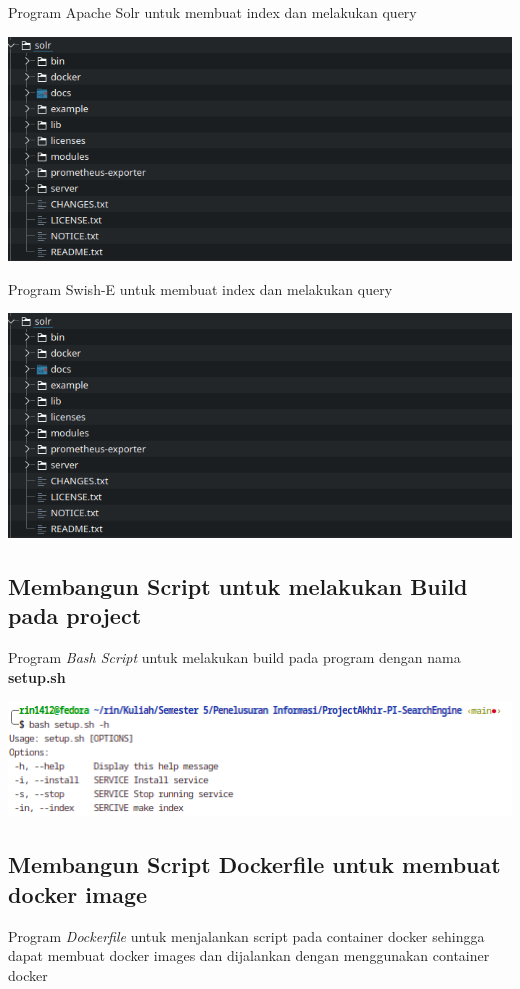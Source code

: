 \documentclass[12pt]{article}
\begin{document}
    Program Apache Solr untuk membuat index dan melakukan query

    \includegraphics[scale=0.8]{images/solr.png}

    Program Swish-E untuk membuat index dan melakukan query

    \includegraphics[scale=0.8]{images/solr.png}

    \subsection*{Membangun Script untuk melakukan Build pada project}

    Program \textit{Bash Script} untuk melakukan build pada program dengan nama \textbf{setup.sh}

    \includegraphics[scale=1.1]{images/script.png}
    
    \subsection*{Membangun Script Dockerfile untuk membuat docker image}
    Program \textit{Dockerfile} untuk menjalankan script pada container docker sehingga dapat membuat docker images dan dijalankan dengan menggunakan container docker
    
\end{document}
